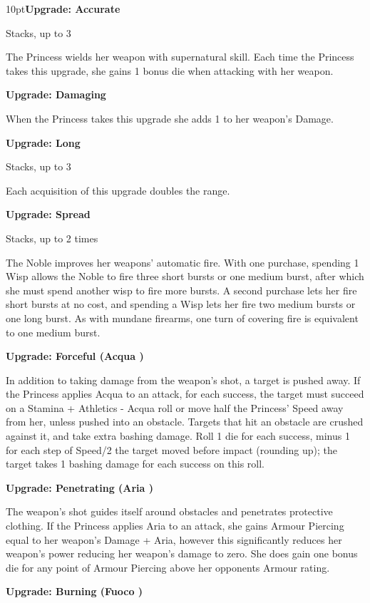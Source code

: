 \begin{myindentpar}{10pt}\textbf{Upgrade: Accurate}

Stacks, up to 3

The Princess wields her weapon with supernatural skill. Each time the Princess takes this upgrade, she gains 1 bonus die when attacking with her weapon.

\textbf{Upgrade: Damaging}

When the Princess takes this upgrade she adds 1 to her weapon’s Damage. 

\textbf{Upgrade: Long}

Stacks, up to 3

Each acquisition of this upgrade doubles the range.

\textbf{Upgrade: Spread}

Stacks, up to 2 times

The Noble improves her weapons' automatic fire. With one purchase, spending 1 Wisp allows the Noble to fire three short bursts or one medium burst, after which she must spend another wisp to fire more bursts. A second purchase lets her fire short bursts at no cost, and spending a Wisp lets her fire two medium bursts or one long burst. As with mundane firearms, one turn of covering fire is equivalent to one medium burst.

\textbf{Upgrade: Forceful (Acqua \textbullet\textbullet)}

In addition to taking damage from the weapon's shot, a target is pushed away. If the Princess applies Acqua to an attack, for each success, the target must succeed on a Stamina + Athletics - Acqua roll or move half the Princess' Speed away from her, unless pushed into an obstacle. Targets that hit an obstacle are crushed against it, and take extra bashing damage. Roll 1 die for each success, minus 1 for each step of Speed/2 the target moved before impact (rounding up); the target takes 1 bashing damage for each success on this roll.

\textbf{Upgrade: Penetrating (Aria \textbullet\textbullet)}

The weapon's shot guides itself around obstacles and penetrates protective clothing. If the Princess applies Aria to an attack, she gains Armour Piercing equal to her weapon's Damage + Aria, however this significantly reduces her weapon's power reducing her weapon's damage to zero. She does gain one bonus die for any point of Armour Piercing above her opponents Armour rating. 

\textbf{Upgrade: Burning (Fuoco \textbullet\textbullet)}


\end{myindentpar}
